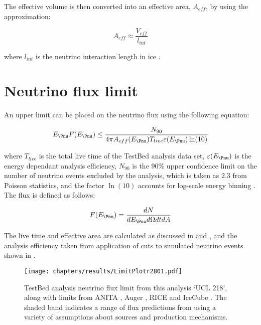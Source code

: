The effective volume is then converted into an effective area, $A_{eff}$, by using the approximation:

\begin{equation}
  A_{eff} \approx \frac{V_{eff}}{l_{int}}
\end{equation}

\noindent where $l_{int}$ is the neutrino interaction length in ice \cite{Allison:2014kha}. 

\section{Neutrino flux limit}
\label{sec:Results:Limit}

An upper limit can be placed on the neutrino flux using the following equation:

\begin{equation}
  E_{\Pnu} F(E_{\Pnu}) \leq \frac{N_{90}}{4\pi A_{eff}(E_{\Pnu}) T_{live} \varepsilon(E_{\Pnu}) \ln(10)}
\end{equation}

\noindent where $T_{live}$ is the total live time of the TestBed analysis data set, $\varepsilon(E_{\Pnu})$ is the energy dependant analysis efficiency, $N_{90}$ is the $90\%$ upper confidence limit on the number of neutrino events excluded by the analysis, which is taken as 2.3 from Poisson statistics, and the factor $\ln(10)$ accounts for log-scale energy binning \cite{Allison:2014kha}. The flux is defined as follows:

\begin{equation}
  F(E_{\Pnu}) = \frac {dN}{dE_{\Pnu} d\Omega dt dA} 
\end{equation}

The live time and effective area are calculated as discussed in  and , and the analysis efficiency taken from application of cuts to simulated neutrino events shown in . 



\begin{figure}[htpb]
  \texttt{[image: chapters/results/LimitPlotr2801.pdf]}
  \caption{TestBed analysis neutrino flux limit from this analysis `UCL 218', along with limits from ANITA \cite{PhysRevD.82.022004}, Auger \cite{Abraham:2009eh}, RICE \cite{PhysRevD.73.082002} and IceCube \cite{PhysRevD.88.112008}. The shaded band indicates a range of flux predictions from \cite{Kotera.2010} using a variety of assumptions about sources and production mechanisms.}
  \label{fig:Results:Limit-Plot}
\end{figure}

